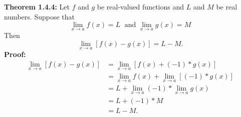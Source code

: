 \documentclass{article}
\begin{document}
	\textbf{Theorem 1.4.4:} Let $f$ and $g$ be real-valued functions and $L$ and $M$ be real numbers. Suppose that
	$$\lim_{x \to a}{f(x)} = L \; \text{ and } \lim_{x \to a}{g(x)} = M$$
	Then
	$$\lim_{x \to a}[{f(x) - g(x)}] = L - M.$$
	\textbf{Proof:}
	\begin{align*}
		\lim_{x \to a}[{f(x) - g(x)}] &= \lim_{x \to a}[{f(x) + (-1) * g(x)}] \\
									  &= \lim_{x \to a}{f(x)} + \lim_{x \to a}{[(-1) * g(x)]} \tag{Theorem 1.4.1} \\
									  &= L + \lim_{x \to a}{(-1)} * \lim_{x \to a}{g(x)} \tag{Theorem 1.4.2} \\
									  &= L + (-1) * M \tag{Theorem 1.4.3} \\
									  &= L - M.
	\end{align*}
\end{document}
